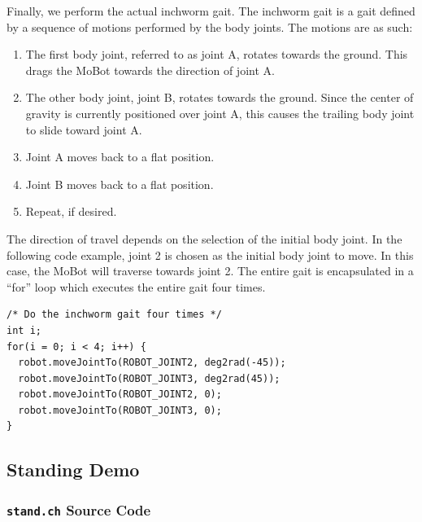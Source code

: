 \documentclass{article}
\begin{document}
Finally, we perform the actual inchworm gait. The inchworm gait is a gait defined
by a sequence of motions performed by the body joints. The motions are as such:
\begin{enumerate}
\item The first body joint, referred to as joint A, rotates towards the ground.
This drags the MoBot towards the direction of joint A.
\item The other body joint, joint B, rotates towards the ground. Since the center
of gravity is currently positioned over joint A, this causes the trailing body 
joint to slide toward joint A.
\item Joint A moves back to a flat position.
\item Joint B moves back to a flat position.
\item Repeat, if desired.
\end{enumerate}
The direction of travel depends on the selection of the initial body joint. In
the following code example, joint 2 is chosen as the initial body joint to move.
In this case, the MoBot will traverse towards joint 2. The entire gait is
encapsulated in a ``for'' loop which executes the entire gait four times.
\begin{verbatim}
/* Do the inchworm gait four times */
int i;
for(i = 0; i < 4; i++) {
  robot.moveJointTo(ROBOT_JOINT2, deg2rad(-45));
  robot.moveJointTo(ROBOT_JOINT3, deg2rad(45));
  robot.moveJointTo(ROBOT_JOINT2, 0);
  robot.moveJointTo(ROBOT_JOINT3, 0);
}
\end{verbatim}

\subsection{Standing Demo}
\subsubsection{\texttt{stand.ch} Source Code}

\end{document}
